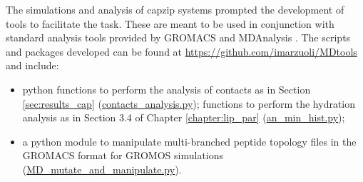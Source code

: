 The simulations and analysis of capzip systems prompted the development of tools to facilitate the task.
%
These are meant to be used in conjunction with standard analysis tools provided by GROMACS \citep{Berendsen1995,Abraham2015,gromacs_man} and MDAnalysis \cite{Michaud-Agrawal2011,Gowers2016}.
%
The scripts and packages developed can be found at \url{https://github.com/imarzuoli/MDtools} and include:
\begin{itemize}
\item python functions to perform the analysis of contacts as in Section \ref{sec:results_cap} (\url{contacts_analysis.py}); functions to perform the hydration analysis as in Section 3.4 of Chapter \ref{chapter:lip_par} (\url{an_min_hist.py});

\item a python module to manipulate multi-branched peptide topology files in the GROMACS format for GROMOS simulations (\url{MD_mutate_and_manipulate.py}).

\end{itemize}
